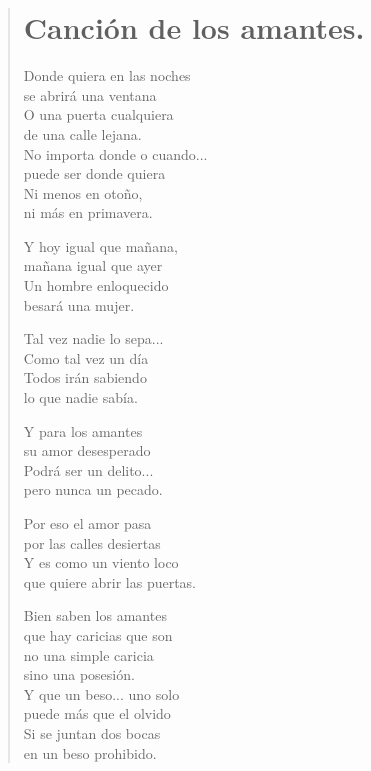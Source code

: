 \documentclass[11pt, portrait, twoside, notitlepage, openright]{book}
\begin{document}
\newpage
\begin{verse}
\begin{center}
\section{Canción de los amantes.}
\end{center}
Donde quiera en las noches\\
se abrirá una ventana\\
O una puerta cualquiera\\
de una calle lejana.\\
No importa donde o cuando...\\
puede ser donde quiera\\
Ni menos en otoño,\\
ni más en primavera.
\newline

Y hoy igual que mañana,\\
mañana igual que ayer\\
Un hombre enloquecido\\
besará una mujer.
\newline

Tal vez nadie lo sepa...\\
Como tal vez un día\\
Todos irán sabiendo\\
lo que nadie sabía.
\newpage

Y para los amantes\\
su amor desesperado\\
Podrá ser un delito...\\
pero nunca un pecado.
\newline

Por eso el amor pasa\\
por las calles desiertas\\
Y es como un viento loco\\
que quiere abrir las puertas.
\newline

Bien saben los amantes\\
que hay caricias que son\\
no una simple caricia\\
sino una posesión.\\
Y que un beso... uno solo\\
puede más que el olvido\\
Si se juntan dos bocas\\
en un beso prohibido.
\newpage


\end{verse}
\end{document}

